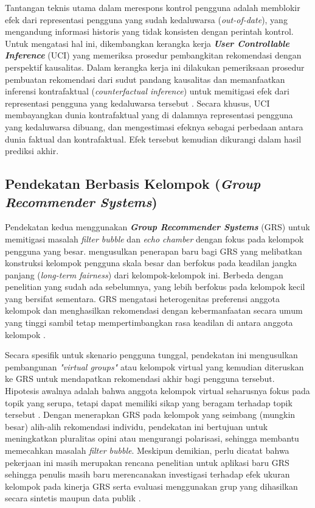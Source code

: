 Tantangan teknis utama dalam merespons kontrol pengguna adalah memblokir efek dari representasi pengguna yang sudah kedaluwarsa (\textit{out-of-date}), yang
mengandung informasi historis yang tidak konsisten dengan perintah kontrol.
Untuk mengatasi hal ini, dikembangkan kerangka kerja \textbf{\textit{User
Controllable Inference}} (UCI) yang memeriksa prosedur pembangkitan rekomendasi dengan perspektif kausalitas. Dalam kerangka kerja ini dilakukan pemeriksaan prosedur pembuatan rekomendasi dari sudut pandang kausalitas dan memanfaatkan inferensi kontrafaktual (\textit{counterfactual inference})
untuk memitigasi efek dari representasi pengguna yang kedaluwarsa tersebut
\autocite{Wang2022}. Secara khusus, UCI membayangkan dunia kontrafaktual yang di dalamnya
representasi pengguna yang kedaluwarsa dibuang, dan mengestimasi efeknya sebagai
perbedaan antara dunia faktual dan kontrafaktual. Efek tersebut kemudian dikurangi dalam hasil prediksi akhir.

\subsection{Pendekatan Berbasis Kelompok (\textit{Group Recommender Systems})}
\label{subsec:grs}

Pendekatan kedua menggunakan \textbf{\textit{Group Recommender Systems}} (GRS)
untuk memitigasi masalah \textit{filter bubble} dan \textit{echo chamber} dengan
fokus pada kelompok pengguna yang besar. \textcite{Dokoupil2022} mengusulkan penerapan baru bagi GRS yang melibatkan konstruksi kelompok pengguna skala besar dan
berfokus pada keadilan jangka panjang (\textit{long-term fairness}) dari
kelompok-kelompok ini. Berbeda dengan penelitian yang sudah ada sebelumnya, yang lebih berfokus pada kelompok kecil yang bersifat sementara. GRS mengatasi heterogenitas preferensi anggota kelompok dan menghasilkan rekomendasi dengan kebermanfaatan secara umum yang tinggi sambil tetap mempertimbangkan rasa keadilan di antara anggota kelompok \autocite{Dokoupil2022}.

Secara spesifik untuk skenario pengguna tunggal, pendekatan ini mengusulkan
pembangunan \textit{"virtual groups"} atau kelompok virtual yang kemudian
diteruskan ke GRS untuk mendapatkan rekomendasi akhir bagi pengguna tersebut.
Hipotesis awalnya adalah bahwa anggota kelompok virtual seharusnya fokus pada
topik yang serupa, tetapi dapat memiliki sikap yang beragam terhadap topik
tersebut \autocite{Dokoupil2022}. Dengan menerapkan GRS pada kelompok yang
seimbang (mungkin besar) alih-alih rekomendasi individu, pendekatan ini
bertujuan untuk meningkatkan pluralitas opini atau mengurangi polarisasi,
sehingga membantu memecahkan masalah \textit{filter bubble}. Meskipun demikian,
perlu dicatat bahwa pekerjaan ini masih merupakan rencana penelitian untuk
aplikasi baru GRS sehingga penulis masih baru merencanakan investigasi terhadap
efek ukuran kelompok pada kinerja GRS serta evaluasi menggunakan grup yang
dihasilkan secara sintetis maupun data publik \autocite{Dokoupil2022}.

